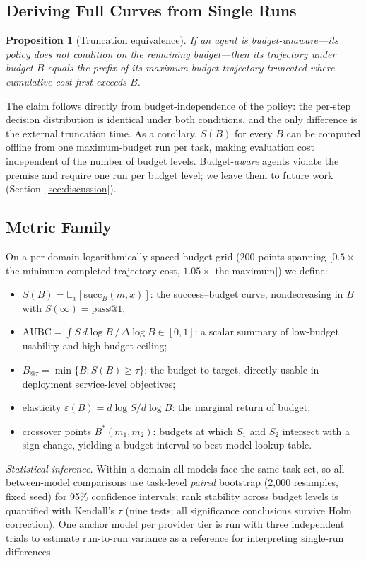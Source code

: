 \documentclass[preprint,authoryear,12pt]{elsarticle}
\newtheorem{proposition}{Proposition}
\begin{document}
\subsection{Deriving Full Curves from Single Runs}
\label{subsec:deriving-curves}
\begin{proposition}[Truncation equivalence]
If an agent is budget-unaware---its policy does not condition on the remaining budget---then its trajectory under budget $B$ equals the prefix of its maximum-budget trajectory truncated where cumulative cost first exceeds $B$.
\end{proposition}
The claim follows directly from budget-independence of the policy: the per-step decision distribution is identical under both conditions, and the only difference is the external truncation time. As a corollary, $S(B)$ for every $B$ can be computed offline from one maximum-budget run per task, making evaluation cost independent of the number of budget levels. Budget-\emph{aware} agents violate the premise and require one run per budget level; we leave them to future work (Section~\ref{sec:discussion}).

\subsection{Metric Family}
\label{subsec:metric-family}
On a per-domain logarithmically spaced budget grid (200 points spanning $[0.5\times$ the minimum completed-trajectory cost, $1.05\times$ the maximum$]$) we define:
\begin{itemize}
\item $S(B) = \mathbb{E}_x[\mathrm{succ}_B(m,x)]$: the success--budget curve, nondecreasing in $B$ with $S(\infty) = \mathrm{pass@1}$;
\item $\mathrm{AUBC} = \int S \, d\log B \,/\, \Delta \log B \in [0,1]$: a scalar summary of low-budget usability and high-budget ceiling;
\item $B_{@\tau} = \min \{B : S(B) \ge \tau\}$: the budget-to-target, directly usable in deployment service-level objectives;
\item elasticity $\varepsilon(B) = d\log S / d\log B$: the marginal return of budget;
\item crossover points $B^{*}(m_1, m_2)$: budgets at which $S_1$ and $S_2$ intersect with a sign change, yielding a budget-interval-to-best-model lookup table.
\end{itemize}
\emph{Statistical inference.} Within a domain all models face the same task set, so all between-model comparisons use task-level \emph{paired} bootstrap (2{,}000 resamples, fixed seed) for 95\% confidence intervals; rank stability across budget levels is quantified with Kendall's $\tau$ (nine tests; all significance conclusions survive Holm correction). One anchor model per provider tier is run with three independent trials to estimate run-to-run variance as a reference for interpreting single-run differences.
\end{document}
